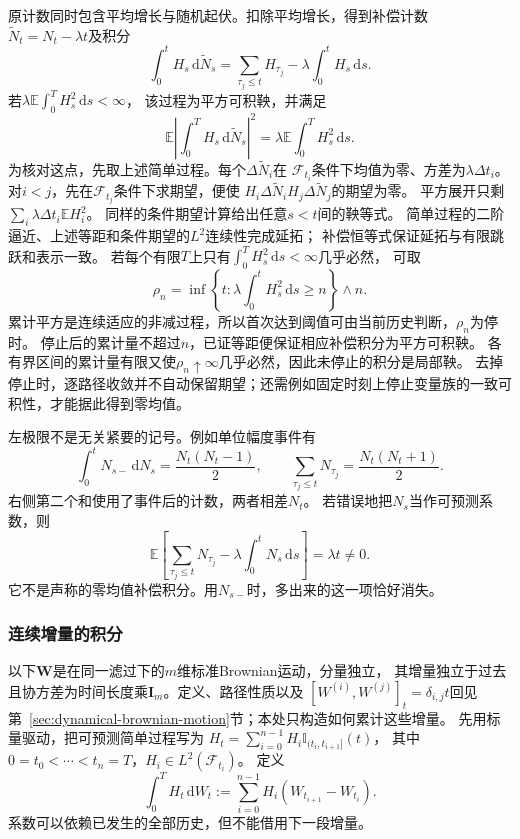 原计数同时包含平均增长与随机起伏。扣除平均增长，得到补偿计数
$\widetilde N_t=N_t-\lambda t$及积分
\begin{equation}
  \int_0^t H_s\,\mathrm d\widetilde N_s
    =\sum_{\tau_j\leq t}H_{\tau_j}
      -\lambda\int_0^t H_s\,\mathrm ds.
  \label{eq:action-state-compensated-poisson}
\end{equation}
若$\lambda\mathbb E\int_0^T H_s^2\,\mathrm ds<\infty$，
该过程为平方可积鞅，并满足
\begin{equation}
  \mathbb E\left|\int_0^T H_s\,\mathrm d\widetilde N_s\right|^2
       =\lambda\mathbb E\int_0^T H_s^2\,\mathrm ds.
  \label{eq:action-state-poisson-isometry}
\end{equation}
为核对这点，先取上述简单过程。每个$\Delta\widetilde N_i$在
$\mathcal F_{t_i}$条件下均值为零、方差为$\lambda\Delta t_i$。
对$i<j$，先在$\mathcal F_{t_j}$条件下求期望，便使
$H_i\Delta\widetilde N_iH_j\Delta\widetilde N_j$的期望为零。
平方展开只剩$\sum_i\lambda\Delta t_i\mathbb E H_i^2$。
同样的条件期望计算给出任意$s<t$间的鞅等式。
简单过程的二阶逼近、上述等距和条件期望的$L^2$连续性完成延拓；
补偿恒等式保证延拓与有限跳跃和表示一致。
若每个有限$T$上只有$\int_0^T H_s^2\,\mathrm ds<\infty$几乎必然，
可取
\[
 \rho_n=\inf\left\{t:\lambda\int_0^tH_s^2\,\mathrm ds\geq n\right\}\wedge n.
\]
累计平方是连续适应的非减过程，所以首次达到阈值可由当前历史判断，$\rho_n$为停时。
停止后的累计量不超过$n$，已证等距便保证相应补偿积分为平方可积鞅。
各有界区间的累计量有限又使$\rho_n\uparrow\infty$几乎必然，因此未停止的积分是局部鞅。
去掉停止时，逐路径收敛并不自动保留期望；还需例如固定时刻上停止变量族的一致可积性，才能据此得到零均值。

左极限不是无关紧要的记号。例如单位幅度事件有
\[
  \int_0^t N_{s-}\,\mathrm dN_s=\frac{N_t(N_t-1)}2,\qquad
  \sum_{\tau_j\leq t}N_{\tau_j}=\frac{N_t(N_t+1)}2.
\]
右侧第二个和使用了事件后的计数，两者相差$N_t$。
若错误地把$N_s$当作可预测系数，则
\[
  \mathbb E\left[\sum_{\tau_j\leq t}N_{\tau_j}
       -\lambda\int_0^t N_s\,\mathrm ds\right]=\lambda t\neq0.
\]
它不是声称的零均值补偿积分。用$N_{s-}$时，多出来的这一项恰好消失。

\subsubsection{连续增量的积分}

以下$\bm W$是在同一滤过下的$m$维标准Brownian运动，分量独立，
其增量独立于过去且协方差为时间长度乘$\bm I_m$。定义、路径性质以及
$[W^{(i)},W^{(j)}]_t=\delta_{i,j}t$回见
第~\ref{sec:dynamical-brownian-motion}节；本处只构造如何累计这些增量。
先用标量驱动，把可预测简单过程写为
$H_t=\sum_{i=0}^{n-1}H_i\mathbb I_{(t_i,t_{i+1}]}(t)$，
其中$0=t_0<\cdots<t_n=T$，$H_i\in L^2(\mathcal F_{t_i})$。
定义
\begin{equation}
  \int_0^T H_t\,\mathrm dW_t
       :=\sum_{i=0}^{n-1}H_i(W_{t_{i+1}}-W_{t_i}).
  \label{eq:dynamical-simple-ito-integral}
\end{equation}
系数可以依赖已发生的全部历史，但不能借用下一段增量。

